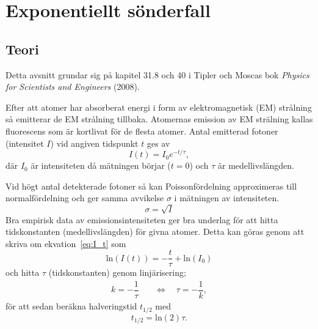 
\section*{\centering Exponentiellt sönderfall}

\subsection*{Teori}

Detta avsnitt grundar sig på kapitel 31.8 och 40 i Tipler och Moscas bok \textit{Physics for Scientists and Engineers} (2008).

Efter att atomer har absorberat energi i form av elektromagnetisk (EM) strålning så emitterar de EM strålning tillbaka. Atomernas emission av EM strälning kallas fluorescens som är kortlivat för de flesta atomer. Antal emitterad fotoner (intensitet $I$) vid angiven tidspunkt $t$ ges av
\begin{equation} \label{eq:I_t}
	I(t) = I_0e^{-t/\tau},
\end{equation}
där $I_0$ är intensiteten då mätningen börjar ($t=0$) och $\tau$ är medellivslängden.

Vid högt antal detekterade fotoner så kan Poissonfördelning approximeras till normalfördelning och ger samma avvikelse $\sigma$ i mätningen av intensiteten.
\begin{equation} \label{eq:I_err}
    \sigma = \sqrt{I}
\end{equation}
Bra empirisk data av emissionsintensiteten ger bra underlag för att hitta tidskonstanten (medellivslängden) för givna atomer. Detta kan göras genom att skriva om ekvation~\ref{eq:I_t} som
\begin{equation} \label{eq:log_I}
	\text{ln}(I(t)) = -\dfrac{t}{\tau} + \text{ln}(I_0)
\end{equation}
och hitta $\tau$ (tidskonstanten) genom linjärisering;
\begin{align}
    k = -\dfrac{1}{\tau} 
    \quad &\Leftrightarrow \quad
	\tau = -\dfrac{1}{k} \label{eq:1_k},
\end{align}
för att sedan beräkna halveringstid $t_{1/2}$ med
\begin{equation} \label{eq:halflife}
    t_{1/2}=\text{ln}(2)\tau.
\end{equation}

